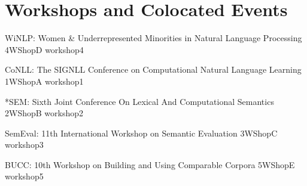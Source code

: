 \chapter[Workshops and Colocated Events: \daydate]{Workshops and Colocated Events}
\thispagestyle{emptyheader}
\vfill





\begin{wsschedule}
  {WiNLP: Women \& Underrepresented Minorities in Natural Language Processing}
  {4}{WShopD}
  {workshop4}
  {\WShopLocD}
  
\end{wsschedule}



\begin{wsschedule}
  {CoNLL: The SIGNLL Conference on Computational Natural Language Learning}
  {1}{WShopA}
  {workshop1}
  {\WShopLocA}
  
\end{wsschedule}

\begin{wsschedule}
  {*SEM: Sixth Joint Conference On Lexical And Computational Semantics}
  {2}{WShopB}
  {workshop2}
  {\WShopLocB}
  
\end{wsschedule}

\begin{wsschedule}
  {SemEval: 11th International Workshop on Semantic Evaluation}
  {3}{WShopC}
  {workshop3}
  {\WShopLocC}
  
\end{wsschedule}


\begin{wsschedule}
  {BUCC: 10th Workshop on Building and Using Comparable Corpora}
  {5}{WShopE}
  {workshop5}
  {\WShopLocE}
  
\end{wsschedule}

